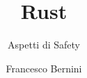 \documentclass{acm_proc_article-sp}
\begin{document}

\title{Rust}
\subtitle{Aspetti di Safety}
%
%
%
%
%

%
\author{
%
%
\alignauthor
Francesco Bernini\\
       \\
}

\maketitle
\begin{abstract}

\end{abstract}
\end{document}
